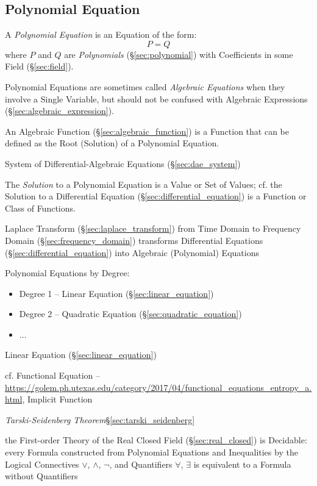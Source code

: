 \subsection{Polynomial Equation}\label{sec:polynomial_equation}

A \emph{Polynomial Equation} is an Equation of the form:
\[
  P = Q
\]
where $P$ and $Q$ are \emph{Polynomials} (\S\ref{sec:polynomial}) with
Coefficients in some Field (\S\ref{sec:field}).

\fist Polynomial Equations are sometimes called \emph{Algebraic Equations} when
they involve a Single Variable, but should not be confused with Algebraic
Expressions (\S\ref{sec:algebraic_expression}).

\fist An Algebraic Function (\S\ref{sec:algebraic_function}) is a Function that
can be defined as the Root (Solution) of a Polynomial Equation.

\fist System of Differential-Algebraic Equations (\S\ref{sec:dae_system})

The \emph{Solution} to a Polynomial Equation is a Value or Set of Values; cf.
the Solution to a Differential Equation (\S\ref{sec:differential_equation}) is
a Function or Class of Functions.

\fist Laplace Transform (\S\ref{sec:laplace_transform}) from Time Domain to
Frequency Domain (\S\ref{sec:frequency_domain}) transforms Differential
Equations (\S\ref{sec:differential_equation}) into Algebraic (Polynomial)
Equations

Polynomial Equations by Degree:
\begin{itemize}
  \item Degree 1 -- Linear Equation (\S\ref{sec:linear_equation})
  \item Degree 2 -- Quadratic Equation (\S\ref{sec:quadratic_equation})
  \item ...
\end{itemize}

Linear Equation (\S\ref{sec:linear_equation})

cf. Functional Equation --
\url{https://golem.ph.utexas.edu/category/2017/04/functional_equations_entropy_a.html},
Implicit Function %


\emph{Tarski-Seidenberg Theorem}\S\ref{sec:tarski_seidenberg}

the First-order Theory of the Real Closed Field (\S\ref{sec:real_closed}) is
Decidable: every Formula constructed from Polynomial Equations and Inequalities
by the Logical Connectives $\vee$, $\wedge$, $\neg$, and Quantifiers $\forall$,
$\exists$ is equivalent to a Formula without Quantifiers



